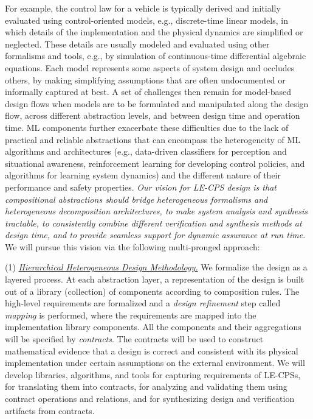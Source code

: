 \documentclass[10pt]{dod-blank}
\begin{document}
For example, the control law for a vehicle is typically derived and initially evaluated using control-oriented models, e.g., discrete-time linear models, in which details of the implementation and the physical dynamics are simplified or neglected. These details are usually modeled and evaluated using other formalisms and tools, e.g., by simulation of continuous-time differential algebraic equations. Each model represents some aspects of system design and occludes others, by making simplifying assumptions that are often undocumented or informally captured at best. A set of challenges then remain for model-based design flows when models are to be formulated and manipulated along the design flow, across different abstraction levels, and between design time and operation time. ML components further exacerbate these difficulties due to the lack of practical and reliable abstractions that can encompass the heterogeneity of ML algorithms and architectures (e.g., data-driven classifiers for perception and situational awareness, reinforcement learning for developing control policies, and algorithms for learning system dynamics) and the different nature of their performance and safety properties. \emph{Our vision for LE-CPS design is that compositional abstractions should bridge heterogeneous formalisms and heterogeneous decomposition architectures, to make system analysis and synthesis tractable, to consistently combine different verification and synthesis methods at design time, and to provide seamless support for dynamic assurance at run time.}  We will pursue this vision via the following multi-pronged approach: 

(1) \underline{\textit{Hierarchical Heterogeneous Design Methodology.}} We formalize the design as a layered process. 
At each abstraction layer, a representation of the design is built out of a library
(collection) of components according to composition rules. 
The high-level requirements are formalized and a \emph{design refinement} step called \emph{mapping} is performed, where the requirements are mapped into the implementation library components. 
All the components and their aggregations will be specified by \emph{contracts}. The contracts will be  used to construct mathematical evidence that a design is correct and consistent with its physical implementation under certain assumptions on the external environment. We will develop libraries, algorithms, and tools for capturing requirements of LE-CPSs, for translating them into contracts, for analyzing and validating them using contract operations and relations, and for synthesizing design and verification artifacts from contracts.  
\end{document}
